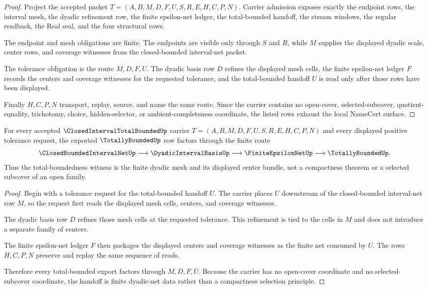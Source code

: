 \begin{proof}
Project the accepted packet $T=(A,B,M,D,F,U,S,R,E,H,C,P,N)$. Carrier admission exposes exactly the endpoint rows, the interval mesh, the dyadic refinement row, the finite epsilon-net ledger, the total-bounded handoff, the stream windows, the regular readback, the Real seal, and the four structural rows.

The endpoint and mesh obligations are finite. The endpoints are visible only through $S$ and $R$, while $M$ supplies the displayed dyadic scale, center rows, and coverage witnesses from the closed-bounded interval-net packet.

The tolerance obligation is the route $M,D,F,U$. The dyadic basis row $D$ refines the displayed mesh cells, the finite epsilon-net ledger $F$ records the centers and coverage witnesses for the requested tolerance, and the total-bounded handoff $U$ is read only after those rows have been displayed.

Finally $H,C,P,N$ transport, replay, source, and name the same route. Since the carrier contains no open-cover, selected-subcover, quotient-equality, trichotomy, choice, hidden-selector, or ambient-completeness coordinate, the listed rows exhaust the local NameCert surface.
\end{proof}

\begin{theorem}
\label{thm:closed-interval-total-bounded-dyadic-net-handoff}
For every accepted $\ClosedIntervalTotalBoundedUp$ carrier $T=(A,B,M,D,F,U,S,R,E,H,C,P,N)$ and every displayed positive tolerance request, the exported $\TotallyBoundedUp$ row factors through the finite route
$$
\ClosedBoundedIntervalNetUp \longrightarrow \DyadicIntervalBasisUp \longrightarrow \FiniteEpsilonNetUp \longrightarrow \TotallyBoundedUp .
$$
Thus the total-boundedness witness is the finite dyadic mesh and its displayed center bundle, not a compactness theorem or a selected subcover of an open family.
\end{theorem}
\begin{proof}
Begin with a tolerance request for the total-bounded handoff $U$. The carrier places $U$ downstream of the closed-bounded interval-net row $M$, so the request first reads the displayed mesh cells, centers, and coverage witnesses.

The dyadic basis row $D$ refines those mesh cells at the requested tolerance. This refinement is tied to the cells in $M$ and does not introduce a separate family of centers.

The finite epsilon-net ledger $F$ then packages the displayed centers and coverage witnesses as the finite net consumed by $U$. The rows $H,C,P,N$ preserve and replay the same sequence of reads.

Therefore every total-bounded export factors through $M,D,F,U$. Because the carrier has no open-cover coordinate and no selected-subcover coordinate, the handoff is finite dyadic-net data rather than a compactness selection principle.
\end{proof}

